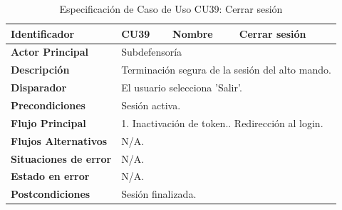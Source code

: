 \begingroup
\setlength{\parskip}{0pt}
\begin{longtable}{|p{3.5cm}|p{2cm}|p{2.5cm}|p{7cm}|}
\caption{Especificación de Caso de Uso CU39: Cerrar sesión}
\label{tab:cu39_sub} \\
\hline
\textbf{Identificador} & CU39 & \textbf{Nombre} & Cerrar sesión \\ \hline
\textbf{Actor Principal} & \multicolumn{3}{p{11.5cm}|}{Subdefensoría} \\ \hline
\textbf{Descripción} & \multicolumn{3}{p{11.5cm}|}{Terminación segura de la sesión del alto mando.} \\ \hline
\textbf{Disparador} & \multicolumn{3}{p{11.5cm}|}{El usuario selecciona 'Salir'.} \\ \hline
\textbf{Precondiciones} & \multicolumn{3}{p{11.5cm}|}{Sesión activa.} \\ \hline
\textbf{Flujo Principal} & \multicolumn{3}{p{11.5cm}|}{1. Inactivación de token.\newline 2. Redirección al login.} \\ \hline
\textbf{Flujos Alternativos} & \multicolumn{3}{p{11.5cm}|}{N/A.} \\ \hline
\textbf{Situaciones de error} & \multicolumn{3}{p{11.5cm}|}{N/A.} \\ \hline
\textbf{Estado en error} & \multicolumn{3}{p{11.5cm}|}{N/A.} \\ \hline
\textbf{Postcondiciones} & \multicolumn{3}{p{11.5cm}|}{Sesión finalizada.} \\ \hline
\end{longtable}
\endgroup